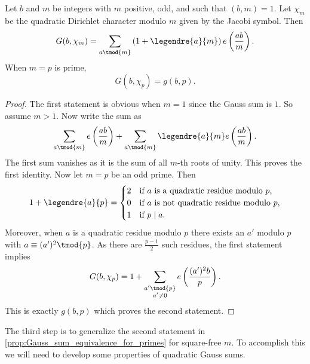 \documentclass[12pt]{article}
\begin{document}
      \begin{proposition}\label{prop:Gauss_sum_equivalence_for_primes}
        Let \(b\) and \(m\) be integers with \(m\) positive, odd, and such that \((b,m) = 1\). Let \(\chi_{m}\) be the quadratic Dirichlet character modulo \(m\) given by the Jacobi symbol. Then
        \[
          G(b,\chi_{m}) = \sum_{a \tmod{m}}\left(1+\legendre{a}{m}\right)e\left(\frac{ab}{m}\right).
        \]
        When \(m = p\) is prime,
        \[
          G(b,\chi_{p}) = g(b,p).
        \]
      \end{proposition}
      \begin{proof}
        The first statement is obvious when \(m = 1\) since the Gauss sum is \(1\). So assume \(m > 1\). Now write the sum as
        \[
          \sum_{a \tmod{m}}e\left(\frac{ab}{m}\right)+\sum_{a \tmod{m}}\legendre{a}{m}e\left(\frac{ab}{m}\right).
        \]
        The first sum vanishes as it is the sum of all \(m\)-th roots of unity. This proves the first identity. Now let \(m = p\) be an odd prime. Then
        \[
          1+\legendre{a}{p} = \begin{cases} 2 & \text{if \(a\) is a quadratic residue modulo \(p\)}, \\ 0 & \text{if \(a\) is not quadratic residue modulo \(p\)}, \\ 1 & \text{if \(p \mid a\)}. \end{cases}
        \]
        Moreover, when \(a\) is a quadratic residue modulo \(p\) there exists an \(a'\) modulo \(p\) with \(a \equiv (a')^{2} \tmod{p}\). As there are \(\frac{p-1}{2}\) such residues, the first statement implies
        \[
          G(b,\chi_{p}) = 1+\sum_{\substack{a' \tmod{p} \\ a' \neq 0}}e\left(\frac{(a')^{2}b}{p}\right).
        \]
        This is exactly \(g(b,p)\) which proves the second statement.
      \end{proof}

      The third step is to generalize the second statement in \cref{prop:Gauss_sum_equivalence_for_primes} for square-free \(m\). To accomplish this we will need to develop some properties of quadratic Gauss sums.
\end{document}
